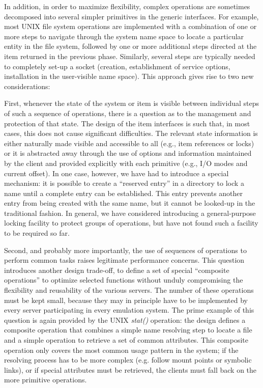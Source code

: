 In addition, in order to maximize flexibility, complex operations are
sometimes decomposed into several simpler primitives in the generic
interfaces. For example, most UNIX file system operations are
implemented with a combination of one or more steps to navigate
through the system name space to locate a particular entity in the
file system, followed by one or more additional steps directed at the
item returned in the previous phase.  Similarly, several steps are
typically needed to completely set-up a socket (creation,
establishment of service options, installation in the user-visible
name space).  This approach gives rise to two new considerations:

First, whenever the state of the system or item is visible between
individual steps of such a sequence of operations, there is a question
as to the management and protection of that state. The design of the
item interfaces is such that, in most cases, this does not cause
significant difficulties. The relevant state information is either
naturally made visible and accessible to all (e.g., item references or
locks) or it is abstracted away through the use of options and
information maintained by the client and provided explicitly with each
primitive (e.g., I/O modes and current offset). In one case, however,
we have had to introduce a special mechanism: it is possible to create
a ``reserved entry'' in a directory to lock a name until a complete
entry can be established.  This entry prevents another entry from
being created with the same name, but it cannot be looked-up in the
traditional fashion. In general, we have considered introducing a
general-purpose locking facility to protect groups of operations, but
have not found such a facility to be required so far.

Second, and probably more importantly, the use of sequences of
operations to perform common tasks raises legitimate performance
concerns. This question introduces another design trade-off, to define
a set of special ``composite operations'' to optimize selected
functions without unduly compromising the flexibility and reusability
of the various servers. The number of these operations must be kept
small, because they may in principle have to be implemented by every
server participating in every emulation system.  The prime example of
this question is again provided by the UNIX {\em stat()} operation:
the design defines a composite operation that combines a simple name
resolving step to locate a file and a simple operation to retrieve a
set of common attributes. This composite operation only covers the
most common usage pattern in the system; if the resolving process has
to be more complex (e.g. follow mount points or symbolic links), or if
special attributes must be retrieved, the clients must fall back on
the more primitive operations.

